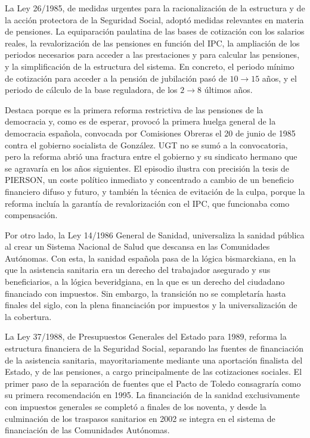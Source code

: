 \documentclass[10pt,a4paper]{article}
\begin{document}
La Ley 26/1985, de medidas urgentes para la racionalización de la estructura y de la acción protectora de la Seguridad Social, adoptó medidas relevantes en materia de pensiones. La equiparación paulatina de las bases de cotización con los salarios reales, la revalorización de las pensiones en función del IPC, la ampliación de los periodos necesarios para acceder a las prestaciones y para calcular las pensiones, y la simplificación de la estructura del sistema. En concreto, el periodo mínimo de cotización para acceder a la pensión de jubilación pasó de $10\to15$ años, y el periodo de cálculo de la base reguladora, de los $2\to 8$ últimos años. 

Destaca porque es la primera reforma restrictiva de las pensiones de la democracia y, como es de esperar, provocó la primera huelga general de la democracia española, convocada por Comisiones Obreras el 20 de junio de 1985 contra el gobierno socialista de González. UGT no se sumó a la convocatoria, pero la reforma abrió una fractura entre el gobierno y su sindicato hermano que se agravaría en los años siguientes. El episodio ilustra con precisión la tesis de PIERSON, un coste político inmediato y concentrado a cambio de un beneficio financiero difuso y futuro, y también la técnica de evitación de la culpa, porque la reforma incluía la garantía de revalorización con el IPC, que funcionaba como compensación.

Por otro lado, la Ley 14/1986 General de Sanidad, universaliza la sanidad pública al crear un Sistema Nacional de Salud que descansa en las Comunidades Autónomas. Con esta, la sanidad española pasa de la lógica bismarckiana, en la que la asistencia sanitaria era un derecho del trabajador asegurado y sus beneficiarios, a la lógica beveridgiana, en la que es un derecho del ciudadano financiado con impuestos. Sin embargo, la transición no se completaría hasta finales del siglo, con la plena financiación por impuestos y la universalización de la cobertura.

La Ley 37/1988, de Presupuestos Generales del Estado para 1989, reforma la estructura financiera de la Seguridad Social, separando las fuentes de financiación de la asistencia sanitaria, mayoritariamente mediante una aportación finalista del Estado, y de las pensiones, a cargo principalmente de las cotizaciones sociales. El primer paso de la separación de fuentes que el Pacto de Toledo consagraría como su primera recomendación en 1995. La financiación de la sanidad exclusivamente con impuestos generales se completó a finales de los noventa, y desde la culminación de los traspasos sanitarios en 2002 se integra en el sistema de financiación de las Comunidades Autónomas.
\end{document}
